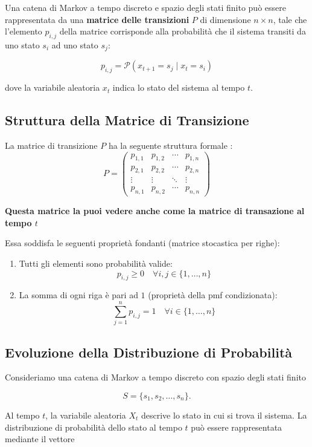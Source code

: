 Una catena di Markov a tempo discreto e spazio degli stati finito può essere rappresentata da una \textbf{matrice delle transizioni} $P$ di dimensione $n \times n$, tale che l'elemento $p_{i,j}$ della matrice corrisponde alla probabilità che il sistema transiti da uno stato $s_i$ ad uno stato $s_j$:

\[
p_{i,j} = \mathcal{P}(x_{t+1} = s_j \mid x_t = s_i)
\]

dove la variabile aleatoria $x_t$ indica lo stato del sistema al tempo $t$.

\subsection{Struttura della Matrice di Transizione}

La matrice di transizione $P$ ha la seguente struttura formale :
\[
P = \begin{pmatrix}
p_{1,1} & p_{1,2} & \cdots & p_{1,n} \\
p_{2,1} & p_{2,2} & \cdots & p_{2,n} \\
\vdots & \vdots & \ddots & \vdots \\
p_{n,1} & p_{n,2} & \cdots & p_{n,n}
\end{pmatrix}
\]

\textbf{Questa matrice la puoi vedere anche come la matrice di transazione al tempo $t$}

Essa soddisfa le seguenti proprietà fondanti (matrice stocastica per righe):
\begin{enumerate}
    \item Tutti gli elementi sono probabilità valide:
    \[
    p_{i,j} \ge 0 \quad \forall i, j \in \{1, \dots, n\}
    \]
    \item La somma di ogni riga è pari ad $1$ (proprietà della pmf condizionata):
    \[
    \sum_{j=1}^{n} p_{i,j} = 1 \quad \forall i \in \{1, \dots, n\}
    \]
\end{enumerate}

\subsection{Evoluzione della Distribuzione di Probabilità}

Consideriamo una catena di Markov a tempo discreto con spazio degli stati finito

\[
S = \{s_1,s_2,\dots,s_n\}.
\]

Al tempo $t$, la variabile aleatoria $X_t$ descrive lo stato in cui si trova il sistema. La distribuzione di probabilità dello stato al tempo $t$ può essere rappresentata mediante il vettore

